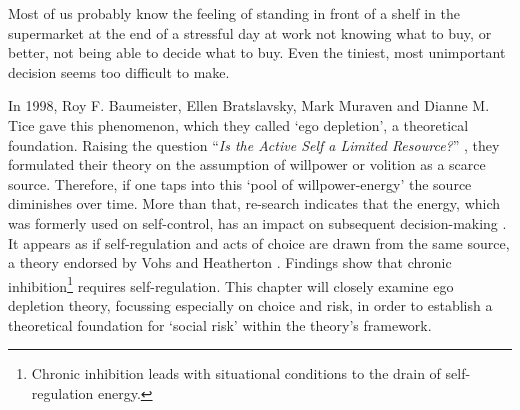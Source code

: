 Most of us probably know the feeling of standing in front of a shelf in the supermarket at the end of a stressful day at work not knowing what to buy, or better, not being able to decide what to buy. Even the tiniest, most unimportant decision seems too difficult to make.\par
In 1998, Roy F. Baumeister, Ellen Bratslavsky, Mark Muraven and Dianne M. Tice gave this phenomenon, which they called ‘ego depletion’, a theoretical foundation. Raising the question “\emph{Is the Active Self a Limited Resource?}” \citep{baumeister1998ego}, they formulated their theory on the assumption of willpower or volition as a scarce source. Therefore, if one taps into this ‘pool of willpower-energy’ the source diminishes over time. More than that, re-search indicates that the energy, which was formerly used on self-control, has an impact on subsequent decision-making \citep{muraven1998self}. It appears as if self-regulation and acts of choice are drawn from the same source, a theory endorsed by Vohs and Heatherton \citep{vohs2000self}. Findings show that chronic inhibition\footnote{Chronic inhibition leads with situational conditions to the drain of self-regulation energy.\citep{vohs2000self} } requires self-regulation. This chapter will closely examine ego depletion theory, focussing especially on choice and risk, in order to establish a theoretical foundation for ‘social risk’ within the theory’s framework.
